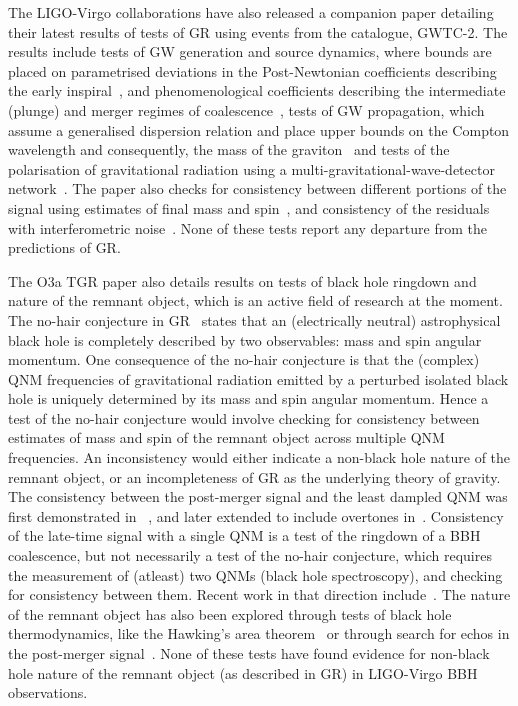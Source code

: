 \documentclass[twocolumn,prd,superscriptaddress,amsfonts,amssymb,amsmath,preprintnumbers]{revtex4-1}
\begin{document}
\par
The LIGO-Virgo collaborations have also released a companion paper detailing their latest results of tests of GR using events from the catalogue, GWTC-2. The results include tests of GW generation and source dynamics, where bounds are placed on parametrised deviations in the Post-Newtonian coefficients describing the early inspiral~\citep{earlydevelopmentpapers}, and phenomenological coefficients describing the intermediate (plunge) and merger regimes of coalescence~\citep{TIGERmethodspapers}, tests of GW propagation, which assume a generalised dispersion relation and place upper bounds on the Compton wavelength and consequently, the mass of the graviton~\citep{gw170104,samajdar2017projected} and tests of the polarisation of gravitational radiation using a multi-gravitational-wave-detector network~\citep{gw170814,isi2017probing}. The paper also checks for consistency between different portions of the signal using estimates of final mass and spin~\citep{Ghosh:2016xx,Ghosh:2017gfp,LSC_2016grtests}, and consistency of the residuals with interferometric noise~\citep{Ghonge:2020suv,gwtc1_tgr}. None of these tests report any departure from the predictions of GR.
\par
The O3a TGR paper also details results on tests of black hole ringdown and nature of the remnant object, which is an active field of research at the moment. The no-hair conjecture in GR~\citep{} states that an (electrically neutral) astrophysical black hole is completely described by two observables: mass and spin angular momentum. One consequence of the no-hair conjecture is that the (complex) QNM frequencies of gravitational radiation emitted by a perturbed isolated black hole is uniquely determined by its mass and spin angular momentum. Hence a test of the no-hair conjecture would involve checking for consistency between estimates of mass and spin of the remnant object across multiple QNM frequencies. An inconsistency would either indicate a non-black hole nature of the remnant object, or an incompleteness of GR as the underlying theory of gravity. The consistency between the post-merger signal and the least dampled QNM was first demonstrated in ~\citep{LSC_2016grtests}, and later extended to include overtones in~\citep{Giesler:2019uxc,Isi:2019aib,Bhagwat:2019dtm,Forteza:2020hbw}. Consistency of the late-time signal with a single QNM is a test of the ringdown of a BBH coalescence, but not necessarily a test of the no-hair conjecture, which requires the measurement of (atleast) two QNMs (black hole spectroscopy), and checking for consistency between them. Recent work in that direction include~\citep{Carullo:2018gah,Carullo:2019flw,Bhagwat:2019bwv}. The nature of the remnant object has also been explored through tests of black hole thermodynamics, like the Hawking's area theorem~\citep{Cabero:2017avf} or through search for echos in the post-merger signal~\citep{Nielsen:2018lkf,Tsang:2019zra,Lo:2018sep,Abedi:2018npz,Abedi:2020sgg,Testa:2018bzd}. None of these tests have found evidence for non-black hole nature of the remnant object (as described in GR) in LIGO-Virgo BBH observations.
\end{document}
